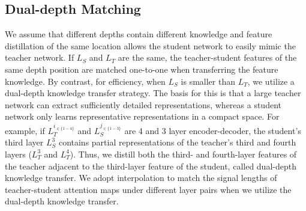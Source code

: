 \documentclass[a4paper]{article}
\begin{document}
\subsection{Dual-depth Matching}
We assume that different depths contain different knowledge and feature distillation of the same location allows the student network to easily mimic the teacher network. If $L_S$ and $L_T$ are the same, the teacher-student features of the same depth position are matched one-to-one when transferring the feature knowledge. By contrast, for efficiency, when $L_S$ is smaller than $L_T$, we utilize a dual-depth knowledge transfer strategy. The basis for this is that a large teacher network can extract sufficiently detailed representations, whereas a student network only learns representative representations in a compact space. 
For example, if $L_T^{i_{\in \{1-4\}}}$ and $L_S^{j_{\in \{1-3\}}}$ are 4 and 3 layer encoder-decoder, the student's third layer $L_S^3$ contains partial representations of the teacher's third and fourth layers ($L_T^3$ and $L_T^4$). Thus, we distill both the third- and fourth-layer features of the teacher adjacent to the third-layer feature of the student, called dual-depth knowledge transfer. We adopt interpolation to match the signal lengths of teacher-student attention maps under different layer pairs when we utilize the dual-depth knowledge transfer.
\begin{table*}[th]
\caption{Objective evaluation results of the proposed method on the DNS no reverb test dataset.}
\label{table:dns_result}
\centering
{}
\end{table*}
\end{document}
